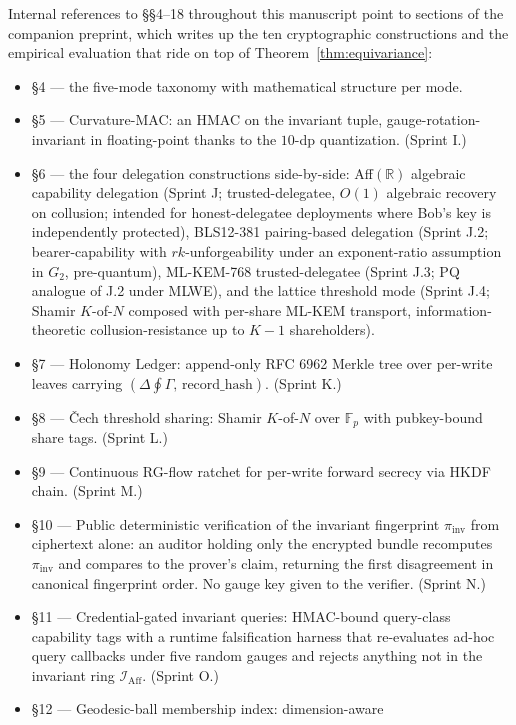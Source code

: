 \documentclass[11pt,letterpaper]{article}
\begin{document}
Internal references to \S\S 4--18 throughout this manuscript point
to sections of the companion preprint, which writes up the ten
cryptographic constructions and the empirical evaluation that ride
on top of Theorem~\ref{thm:equivariance}:
\begin{itemize}[nosep,leftmargin=*]
\item \S 4 --- the five-mode taxonomy with mathematical structure
  per mode.
\item \S 5 --- Curvature-MAC: an HMAC on the invariant tuple,
  gauge-rotation-invariant in floating-point thanks to the $10$-dp
  quantization. (Sprint I.)
\item \S 6 --- the four delegation constructions side-by-side:
  Aff$(\mathbb{R})$ algebraic capability delegation (Sprint J;
  trusted-delegatee, $O(1)$ algebraic recovery on collusion;
  intended for honest-delegatee deployments where Bob's key is
  independently protected), BLS12-381 pairing-based delegation
  (Sprint J.2; bearer-capability with $rk$-unforgeability under
  an exponent-ratio assumption in $G_2$, pre-quantum),
  ML-KEM-768 trusted-delegatee (Sprint J.3; PQ
  analogue of J.2 under MLWE), and the lattice threshold mode
  (Sprint J.4; Shamir $K$-of-$N$ composed with per-share ML-KEM
  transport, information-theoretic collusion-resistance up to
  $K{-}1$ shareholders).
\item \S 7 --- Holonomy Ledger: append-only RFC 6962 Merkle tree
  over per-write leaves carrying $(\Delta \oint \Gamma,\,
  \text{record\_hash})$. (Sprint K.)
\item \S 8 --- \v{C}ech threshold sharing: Shamir $K$-of-$N$ over
  $\mathbb{F}_p$ with pubkey-bound share tags. (Sprint L.)
\item \S 9 --- Continuous RG-flow ratchet for per-write forward
  secrecy via HKDF chain. (Sprint M.)
\item \S 10 --- Public deterministic verification of the invariant
  fingerprint $\pi_{\mathrm{inv}}$ from ciphertext alone: an
  auditor holding only the encrypted bundle recomputes $\pi_{\mathrm{inv}}$
  and compares to the prover's claim, returning the first
  disagreement in canonical fingerprint order. No gauge key given
  to the verifier. (Sprint N.)
\item \S 11 --- Credential-gated invariant queries: HMAC-bound
  query-class capability tags with a runtime falsification harness
  that re-evaluates ad-hoc query callbacks under five random
  gauges and rejects anything not in the invariant ring
  $\mathcal{I}_{\mathrm{Aff}}$. (Sprint O.)
\item \S 12 --- Geodesic-ball membership index: dimension-aware

\end{itemize}
\end{document}
